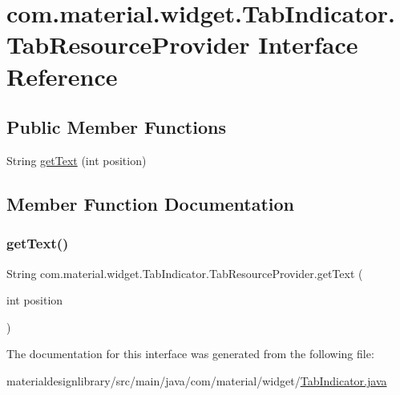 \hypertarget{interfacecom_1_1material_1_1widget_1_1_tab_indicator_1_1_tab_resource_provider}{}\section{com.\+material.\+widget.\+Tab\+Indicator.\+Tab\+Resource\+Provider Interface Reference}
\label{interfacecom_1_1material_1_1widget_1_1_tab_indicator_1_1_tab_resource_provider}
\subsection*{Public Member Functions}
\begin{DoxyCompactItemize}
\item 
String \hyperlink{interfacecom_1_1material_1_1widget_1_1_tab_indicator_1_1_tab_resource_provider_aef47d120918e0cdf2d51d3d690c1d1f5}{get\+Text} (int position)
\end{DoxyCompactItemize}


\subsection{Member Function Documentation}
\mbox{\label{interfacecom_1_1material_1_1widget_1_1_tab_indicator_1_1_tab_resource_provider_aef47d120918e0cdf2d51d3d690c1d1f5}} 
\subsubsection{\texorpdfstring{get\+Text()}{getText()}}
{\footnotesize\ttfamily String com.\+material.\+widget.\+Tab\+Indicator.\+Tab\+Resource\+Provider.\+get\+Text (\begin{DoxyParamCaption}\item[{int}]{position }\end{DoxyParamCaption})}



The documentation for this interface was generated from the following file\+:\begin{DoxyCompactItemize}
\item 
materialdesignlibrary/src/main/java/com/material/widget/\hyperlink{_tab_indicator_8java}{Tab\+Indicator.\+java}\end{DoxyCompactItemize}
